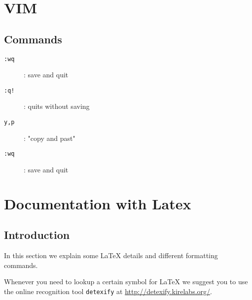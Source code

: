 \documentclass[10pt,a4paper]{scrartcl}
\begin{document}
\section{VIM}
\subsection{Commands}
\begin{description}

\item[\texttt{:wq}] : save and quit
\begin{terminalcode}
\end{terminalcode}

\item[\texttt{:q!}] : quits without saving
\begin{terminalcode}
\end{terminalcode}

\item[\texttt{y,p}] : "copy and past"
\begin{terminalcode}
\end{terminalcode}

\item[\texttt{:wq}] : save and quit
\begin{terminalcode}
\end{terminalcode}





\end{description}





\section{Documentation with Latex}
\subsection{Introduction} 

In this section we explain some \LaTeX\xspace details and different formatting
commands.

Whenever you need to lookup a certain symbol for \LaTeX\xspace we suggest you to use
the online recognition tool \texttt{detexify} at \url{http://detexify.kirelabs.org/}.
\end{document}
